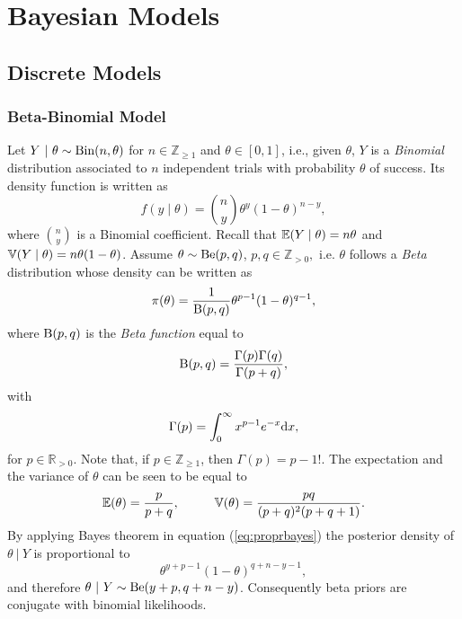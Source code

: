 
\chapter{Bayesian Models} %


 
\label{appendixE} %


\section{Discrete Models}
\subsection{Beta-Binomial Model}
\label{sec:beta}
Let $Y~|~\theta\sim \textnormal{Bin}(n,\theta)$ for $n\in\mathbb{Z}_{\geq 1}$ and $\theta \in [0,1]$, i.e., given $\theta$, $Y$ is a \textit{Binomial} distribution associated to $n$ independent trials with probability $\theta$ of success. Its density function is written as
\begin{equation*}
f(y\;|\;\theta)=\binom{n}{y}\theta^y(1-\theta)^{n-y},
\end{equation*}
where $\binom{n}{y}$ is a Binomial coefficient.
Recall that $\mathbb{E}(Y\;|\;\theta)=n\theta$ and $\mathbb{V}(Y\;|\;\theta)=n\theta(1-\theta)$. Assume $\theta\sim \textnormal{Be}(p,q)$, $p,q\in\mathbb{Z}_{>0},$ i.e. $\theta$ follows a \textit{Beta} distribution whose density can be written as
\begin{equation*}
\pi(\theta)=\frac{1}{\textnormal{B}(p,q)}\theta^{p-1}(1-\theta)^{q-1},
\end{equation*}
where $\textnormal{B}(p,q)$ is the \textit{Beta function} equal to
\begin{equation}
\label{eq:betafunction}
\B(p,q)=\frac{\Gamma(p)\Gamma(q)}{\Gamma(p+q)},
\end{equation}
with 
\begin{equation*}
\Gamma(p)=\int_{0}^{\infty}x^{p-1}e^{-x}\textnormal{d} x,
\end{equation*}
for $p\in\mathbb{R}_{>0}$. Note that, if $p\in\mathbb{Z}_{\geq 1}$, then $\Gamma(p)=p-1!$. The expectation and the variance of $\theta$ can be seen to be equal to 
\begin{equation*}
\mathbb{E}(\theta)=\frac{p}{p+q},\;\;\;\;\;\;\;\;\;\; \mathbb{V}(\theta)=\frac{pq}{(p+q)^2(p+q+1)}.
\end{equation*}
By applying Bayes theorem in equation (\ref{eq:proprbayes}) the posterior density of $\theta~|~Y$ is proportional to
\begin{equation*}
\theta^{y+p-1}(1-\theta)^{q+n-y-1},
\end{equation*}
and therefore $\theta~|~Y\sim \textnormal{Be}(y+p,q+n-y)$. Consequently  beta priors are conjugate with binomial likelihoods. 

